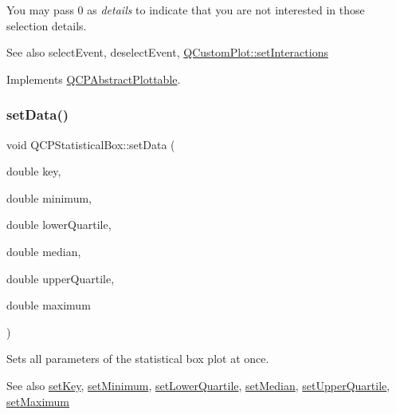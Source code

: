 You may pass 0 as {\itshape details} to indicate that you are not interested in those selection details.

\begin{DoxySeeAlso}{See also}
select\+Event, deselect\+Event, \hyperlink{class_q_custom_plot_a5ee1e2f6ae27419deca53e75907c27e5}{Q\+Custom\+Plot\+::set\+Interactions} 
\end{DoxySeeAlso}


Implements \hyperlink{class_q_c_p_abstract_plottable_a38efe9641d972992a3d44204bc80ec1d}{Q\+C\+P\+Abstract\+Plottable}.

\hypertarget{class_q_c_p_statistical_box_adf50c57b635edb12470c0e4a986aff37}{}\label{class_q_c_p_statistical_box_adf50c57b635edb12470c0e4a986aff37} 
\subsubsection{\texorpdfstring{set\+Data()}{setData()}}
{\footnotesize\ttfamily void Q\+C\+P\+Statistical\+Box\+::set\+Data (\begin{DoxyParamCaption}\item[{double}]{key,  }\item[{double}]{minimum,  }\item[{double}]{lower\+Quartile,  }\item[{double}]{median,  }\item[{double}]{upper\+Quartile,  }\item[{double}]{maximum }\end{DoxyParamCaption})}

Sets all parameters of the statistical box plot at once.

\begin{DoxySeeAlso}{See also}
\hyperlink{class_q_c_p_statistical_box_a84a1c6d34b2f9af40bca0c527d51e97e}{set\+Key}, \hyperlink{class_q_c_p_statistical_box_a84ff7cc61ba44890f0c3e0c99c19941e}{set\+Minimum}, \hyperlink{class_q_c_p_statistical_box_a680941af5e23d902013962fa67223f9e}{set\+Lower\+Quartile}, \hyperlink{class_q_c_p_statistical_box_a65970e77a897da4ecb4b15300868aad3}{set\+Median}, \hyperlink{class_q_c_p_statistical_box_a65a1375f941c5a2077b5201229e89346}{set\+Upper\+Quartile}, \hyperlink{class_q_c_p_statistical_box_acec5ad1901f00f2c5387cfb4d9787eb3}{set\+Maximum} 
\end{DoxySeeAlso}
\hypertarget{class_q_c_p_statistical_box_a84a1c6d34b2f9af40bca0c527d51e97e}{}\label{class_q_c_p_statistical_box_a84a1c6d34b2f9af40bca0c527d51e97e} 
